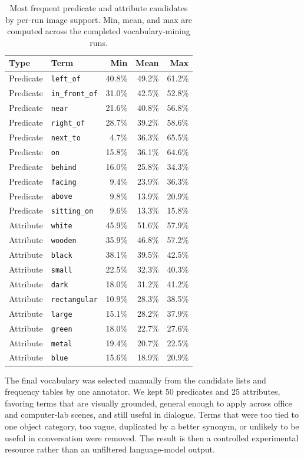 \begin{table}[!htbp]
\centering
\small
\caption{Most frequent predicate and attribute candidates by per-run image support. Min, mean, and max are computed across the completed vocabulary-mining runs.}\label{tab:vocab-top-support}
\begin{tabular}{llrrr}
\toprule
Type & Term & Min & Mean & Max \\
\midrule
Predicate & \texttt{left\_of} & 40.8\% & 49.2\% & 61.2\% \\
Predicate & \texttt{in\_front\_of} & 31.0\% & 42.5\% & 52.8\% \\
Predicate & \texttt{near} & 21.6\% & 40.8\% & 56.8\% \\
Predicate & \texttt{right\_of} & 28.7\% & 39.2\% & 58.6\% \\
Predicate & \texttt{next\_to} & 4.7\% & 36.3\% & 65.5\% \\
Predicate & \texttt{on} & 15.8\% & 36.1\% & 64.6\% \\
Predicate & \texttt{behind} & 16.0\% & 25.8\% & 34.3\% \\
Predicate & \texttt{facing} & 9.4\% & 23.9\% & 36.3\% \\
Predicate & \texttt{above} & 9.8\% & 13.9\% & 20.9\% \\
Predicate & \texttt{sitting\_on} & 9.6\% & 13.3\% & 15.8\% \\
\midrule
Attribute & \texttt{white} & 45.9\% & 51.6\% & 57.9\% \\
Attribute & \texttt{wooden} & 35.9\% & 46.8\% & 57.2\% \\
Attribute & \texttt{black} & 38.1\% & 39.5\% & 42.5\% \\
Attribute & \texttt{small} & 22.5\% & 32.3\% & 40.3\% \\
Attribute & \texttt{dark} & 18.0\% & 31.2\% & 41.2\% \\
Attribute & \texttt{rectangular} & 10.9\% & 28.3\% & 38.5\% \\
Attribute & \texttt{large} & 15.1\% & 28.2\% & 37.9\% \\
Attribute & \texttt{green} & 18.0\% & 22.7\% & 27.6\% \\
Attribute & \texttt{metal} & 19.4\% & 20.7\% & 22.5\% \\
Attribute & \texttt{blue} & 15.6\% & 18.9\% & 20.9\% \\
\bottomrule
\end{tabular}
\end{table}

The final vocabulary was selected manually from the candidate lists and frequency tables by one annotator. We kept 50 predicates and 25 attributes, favoring terms that are visually grounded, general enough to apply across office and computer-lab scenes, and still useful in dialogue. Terms that were too tied to one object category, too vague, duplicated by a better synonym, or unlikely to be useful in conversation were removed. The result is then a controlled experimental resource rather than an unfiltered language-model output.

